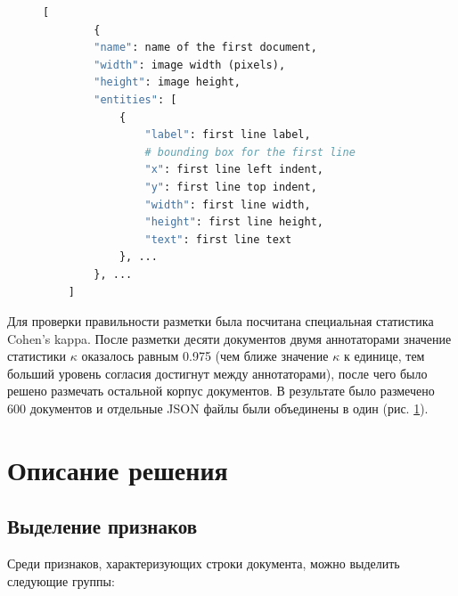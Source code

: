 \documentclass{ProcISPRAS}
\begin{document}
\begin{figure}[t]
    \centering
    \begin{lstlisting}[language=Python,frame=none,basicstyle=\ttfamily]
    [
        {
        "name": name of the first document,
        "width": image width (pixels),
        "height": image height,
        "entities": [
            {
                "label": first line label,
                # bounding box for the first line
                "x": first line left indent,
                "y": first line top indent,
                "width": first line width,
                "height": first line height,
                "text": first line text
            }, ...
        }, ...
    ]
    \end{lstlisting}
    \label{fig:label}
\end{figure}

Для проверки правильности разметки была посчитана специальная статистика Cohen's kappa. После разметки десяти документов двумя аннотаторами значение статистики $\kappa$ оказалось равным 0.975 (чем ближе значение $\kappa$ к единице, тем больший уровень согласия достигнут между аннотаторами), после чего было решено размечать остальной корпус документов. В результате было размечено 600 документов и отдельные JSON файлы были объединены в один (рис. \ref{fig:label}).

\section{Описание решения}

\subsection{Выделение признаков}

Среди признаков, характеризующих строки документа, можно выделить следующие группы:
\end{document}
